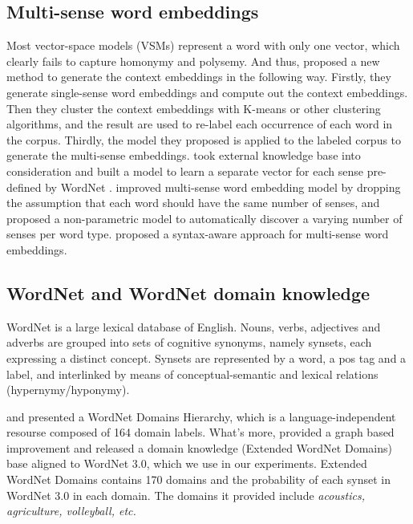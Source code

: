 \documentclass[11pt]{article}
\begin{document}
\subsection{Multi-sense word embeddings}
\par
Most vector-space models (VSMs) represent a word with only one vector, which clearly fails to capture homonymy and polysemy. And thus,  proposed a new method to generate the context embeddings in the following way. Firstly, they generate single-sense word embeddings and compute out the context embeddings. Then they cluster the context embeddings with K-means or other clustering algorithms, and the result are used to re-label each occurrence of each word in the corpus. Thirdly, the model they proposed is applied to the labeled corpus to generate the multi-sense embeddings.  took external knowledge base into consideration and built a model to learn a separate vector for each sense pre-defined by WordNet \cite{miller1995wordnet}.  improved multi-sense word embedding model by dropping the assumption that each word should have the same number of senses, and proposed a  non-parametric model to automatically discover a varying number of senses per word type.  proposed a syntax-aware approach for multi-sense word embeddings. 
\subsection{WordNet and WordNet domain knowledge}
\par
WordNet \cite{miller1995wordnet} is a large lexical database of English. Nouns, verbs, adjectives and adverbs are grouped into sets of cognitive synonyms, namely synsets, each expressing a distinct concept. Synsets are represented by a word, a pos tag and a label, and interlinked by means of conceptual-semantic and lexical relations (hypernymy/hyponymy).
\par
{} and  presented a WordNet Domains Hierarchy, which is a language-independent resourse composed of 164 domain labels. What's more,  provided a graph based improvement and released a domain knowledge (Extended WordNet Domains) base aligned to WordNet 3.0, which we use in our experiments. Extended WordNet Domains contains 170 domains and the probability of each synset in WordNet 3.0 in each domain. The domains it provided include {\sl acoustics, agriculture, volleyball, etc.}
\end{document}
